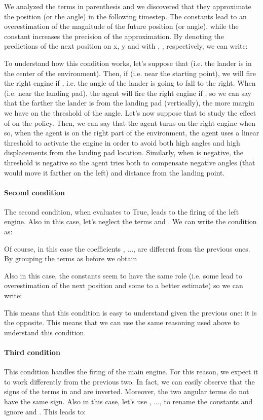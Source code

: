 \documentclass[review,english]{elsarticle}
\begin{document}
We analyzed the terms in parenthesis and we discovered that they approximate the position (or the angle) in the following timestep.
The constants  lead to an overestimation of the magnitude of the future position (or angle), while the constant  increases the precision of the approximation.
By denoting the predictions of the next position on  x, y and  with , ,  respectively, we can write:

To understand how this condition works, let's suppose that  (i.e. the lander is in the center of the environment). 
Then, if  (i.e. near the starting point), we will fire the right engine if , i.e. the angle of the lander is going to fall to the right.
When  (i.e. near the landing pad), the agent will fire the right engine if , so we can say that the farther the lander is from the landing pad (vertically), the more margin we have on the threshold of the angle.
Let's now suppose that  to study the effect of  on the policy.
Then, we can say that the agent turns on the right engine when  so, when the agent is on the right part of the environment, the agent uses a linear threshold to activate the engine in order to avoid both high angles and high displacements from the landing pad location.
Similarly, when  is negative, the threshold is negative so the agent tries both to compensate negative angles (that would move it farther on the left) and distance from the landing point.

\paragraph{Second condition}
The second condition, when evaluates to True, leads to the firing of the left engine.
Also in this case, let's neglect the terms  and .
We can write the condition as:

Of course, in this case the coefficients , ...,  are different from the previous ones.
By grouping the terms as before we obtain

Also in this case, the constants seem to have the same role (i.e. some lead to overestimation of the next position and some to a better estimate) so we can write:


This means that this condition is easy to understand given the previous one: it is the opposite.
This means that we can use the same reasoning used above to understand this condition.

\paragraph{Third condition}
This condition handles the firing of the main engine.
For this reason, we expect it to work differently from the previous two.
In fact, we can easily observe that the signs of the terms in  and  are inverted. 
Moreover, the two angular terms do not have the same sign.
Also in this case, let's use , ...,  to rename the constants and ignore  and .
This leads to:
\end{document}
